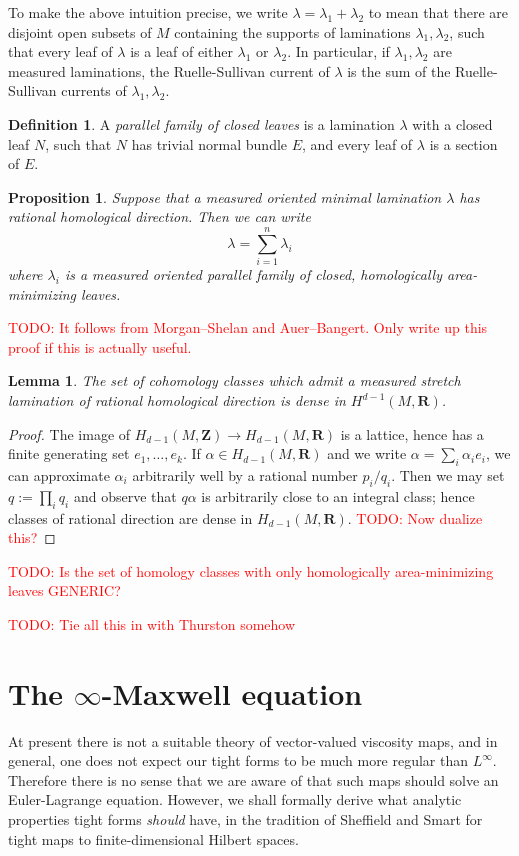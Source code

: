 \documentclass[reqno,11pt]{amsart}
\newcommand{\ZZ}{\mathbf{Z}}
\newcommand{\RR}{\mathbf{R}}
\newcommand{\dfn}[1]{\emph{#1}\index{#1}}
\newtheorem{lemma}[theorem]{Lemma}
\newtheorem{proposition}[theorem]{Proposition}
\theoremstyle{definition}
\newtheorem{definition}[theorem]{Definition}
\numberwithin{equation}{section}
\newcommand\todo[1]{\textcolor{red}{TODO: #1}}
\begin{document}
To make the above intuition precise, we write $\lambda = \lambda_1 + \lambda_2$ to mean that there are disjoint open subsets of $M$ containing the supports of laminations $\lambda_1, \lambda_2$, such that every leaf of $\lambda$ is a leaf of either $\lambda_1$ or $\lambda_2$.
In particular, if $\lambda_1, \lambda_2$ are measured laminations, the Ruelle-Sullivan current of $\lambda$ is the sum of the Ruelle-Sullivan currents of $\lambda_1, \lambda_2$.

\begin{definition}
A \dfn{parallel family of closed leaves} is a lamination $\lambda$ with a closed leaf $N$, such that $N$ has trivial normal bundle $E$, and every leaf of $\lambda$ is a section of $E$.
\end{definition}

\begin{proposition}
Suppose that a measured oriented minimal lamination $\lambda$ has rational homological direction.
Then we can write
$$\lambda = \sum_{i=1}^n \lambda_i$$
where $\lambda_i$ is a measured oriented parallel family of closed, homologically area-minimizing leaves.
\end{proposition}

\todo{It follows from Morgan--Shelan and Auer--Bangert. Only write up this proof if this is actually useful.}

\begin{lemma}
The set of cohomology classes which admit a measured stretch lamination of rational homological direction is dense in $H^{d - 1}(M, \RR)$.
\end{lemma}
\begin{proof}
The image of $H_{d - 1}(M, \ZZ) \to H_{d - 1}(M, \RR)$ is a lattice, hence has a finite generating set $e_1, \dots, e_k$.
If $\alpha \in H_{d - 1}(M, \RR)$ and we write $\alpha = \sum_i \alpha_i e_i$, we can approximate $\alpha_i$ arbitrarily well by a rational number $p_i/q_i$.
Then we may set $q := \prod_i q_i$ and observe that $q \alpha$ is arbitrarily close to an integral class; hence classes of rational direction are dense in $H_{d - 1}(M, \RR)$. \todo{Now dualize this?}
\end{proof}

\todo{Is the set of homology classes with only homologically area-minimizing leaves GENERIC?}



\todo{Tie all this in with Thurston somehow}

\section{The \texorpdfstring{$\infty$-Maxwell}{infinity-Maxwell} equation}
At present there is not a suitable theory of vector-valued viscosity maps, and in general, one does not expect our tight forms to be much more regular than $L^\infty$.
Therefore there is no sense that we are aware of that such maps should solve an Euler-Lagrange equation.
However, we shall formally derive what analytic properties tight forms \emph{should} have, in the tradition of Sheffield and Smart \cite{Sheffield12} for tight maps to finite-dimensional Hilbert spaces.
\end{document}
